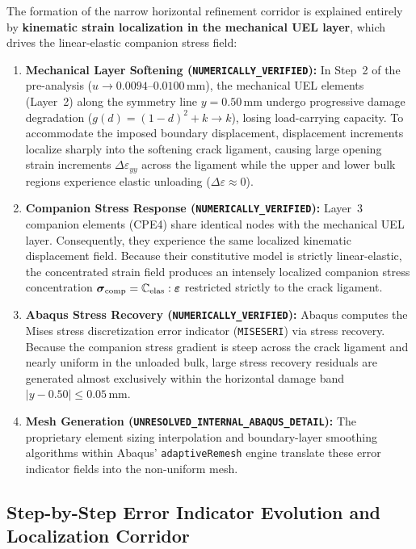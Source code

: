 The formation of the narrow horizontal refinement corridor is explained entirely by \textbf{kinematic strain localization in the mechanical UEL layer}, which drives the linear-elastic companion stress field:
\begin{enumerate}
    \item \textbf{Mechanical Layer Softening (\texttt{NUMERICALLY\_VERIFIED}):} In Step~2 of the pre-analysis ($u \to 0.0094\text{--}0.0100\,\mathrm{mm}$), the mechanical UEL elements (Layer~2) along the symmetry line $y = 0.50\,\mathrm{mm}$ undergo progressive damage degradation ($g(d) = (1-d)^2 + k \to k$), losing load-carrying capacity. To accommodate the imposed boundary displacement, displacement increments localize sharply into the softening crack ligament, causing large opening strain increments $\Delta\varepsilon_{yy}$ across the ligament while the upper and lower bulk regions experience elastic unloading ($\Delta\varepsilon \approx 0$).
    \item \textbf{Companion Stress Response (\texttt{NUMERICALLY\_VERIFIED}):} Layer~3 companion elements (CPE4) share identical nodes with the mechanical UEL layer. Consequently, they experience the same localized kinematic displacement field. Because their constitutive model is strictly linear-elastic, the concentrated strain field produces an intensely localized companion stress concentration $\boldsymbol{\sigma}_{\mathrm{comp}} = \mathbb{C}_{\mathrm{elas}} : \boldsymbol{\varepsilon}$ restricted strictly to the crack ligament.
    \item \textbf{Abaqus Stress Recovery (\texttt{NUMERICALLY\_VERIFIED}):} Abaqus computes the Mises stress discretization error indicator (\texttt{MISESERI}) via stress recovery. Because the companion stress gradient is steep across the crack ligament and nearly uniform in the unloaded bulk, large stress recovery residuals are generated almost exclusively within the horizontal damage band $|y - 0.50| \le 0.05\,\mathrm{mm}$.
    \item \textbf{Mesh Generation (\texttt{UNRESOLVED\_INTERNAL\_ABAQUS\_DETAIL}):} The proprietary element sizing interpolation and boundary-layer smoothing algorithms within Abaqus' \texttt{adaptiveRemesh} engine translate these error indicator fields into the non-uniform mesh.
\end{enumerate}

\subsection{Step-by-Step Error Indicator Evolution and Localization Corridor}
\label{subsec:stage14r_evolution}

